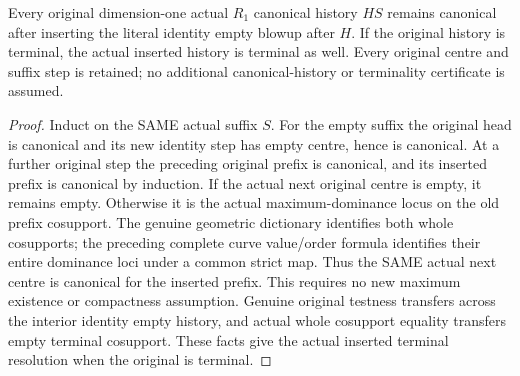 \begin{theorem}
\label{hir:original-curve-interior-canonical-terminal-history}
\leanok
Every original dimension-one actual $R_1$ canonical history $HS$ remains
canonical after inserting the literal identity empty blowup after $H$.
If the original history is terminal, the actual inserted history is terminal
as well. Every original centre and suffix step is retained; no additional
canonical-history or terminality certificate is assumed.
\end{theorem}
\begin{proof}
Induct on the SAME actual suffix $S$. For the empty suffix the original head
is canonical and its new identity step has empty centre, hence is canonical.
At a further original step the preceding original prefix is canonical, and
its inserted prefix is canonical by induction. If the actual next original
centre is empty, it remains empty. Otherwise it is the actual maximum-dominance
locus on the old prefix cosupport. The genuine geometric dictionary identifies
both whole cosupports; the preceding complete curve value/order formula
identifies their entire dominance loci under a common strict map. Thus the
SAME actual next centre is canonical for the inserted prefix. This requires
no new maximum existence or compactness assumption. Genuine original testness
transfers across the interior identity empty history, and actual whole
cosupport equality transfers empty terminal cosupport. These facts give the
actual inserted terminal resolution when the original is terminal.
\end{proof}
